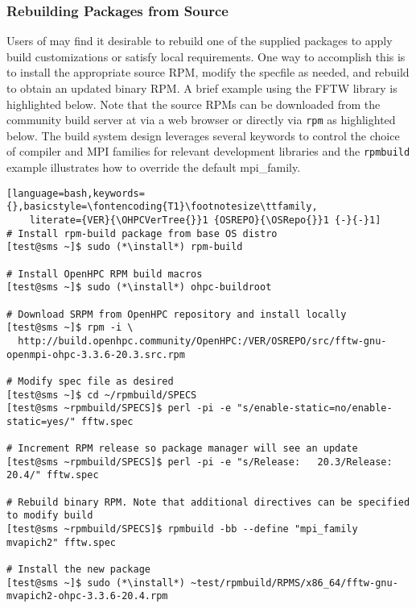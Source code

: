 \subsubsection{Rebuilding Packages from Source}  \label{appendix:rpmbuild}

Users of \OHPC{} may find it desirable to rebuild one of the supplied packages
to apply build customizations or satisfy local requirements. One way to
accomplish this is to install the appropriate source RPM, modify the specfile
as needed, and rebuild to obtain an updated binary RPM. A brief example using
the FFTW library is highlighted below.  Note that the source RPMs can be downloaded from the
community build server at \href{https://build.openhpc.community}
{\color{blue}{https://build.openhpc.community}} via a web browser or directly
via \texttt{rpm} as highlighted below. The \OHPC{} build system design
leverages several keywords to control the choice of compiler and MPI families
for relevant development libraries and the \texttt{rpmbuild} example
illustrates how to override the default mpi\_family.

\begin{lstlisting}[language=bash,keywords={},basicstyle=\fontencoding{T1}\footnotesize\ttfamily,
    literate={VER}{\OHPCVerTree{}}1 {OSREPO}{\OSRepo{}}1 {-}{-}1]
# Install rpm-build package from base OS distro
[test@sms ~]$ sudo (*\install*) rpm-build

# Install OpenHPC RPM build macros
[test@sms ~]$ sudo (*\install*) ohpc-buildroot

# Download SRPM from OpenHPC repository and install locally
[test@sms ~]$ rpm -i \
  http://build.openhpc.community/OpenHPC:/VER/OSREPO/src/fftw-gnu-openmpi-ohpc-3.3.6-20.3.src.rpm

# Modify spec file as desired
[test@sms ~]$ cd ~/rpmbuild/SPECS
[test@sms ~rpmbuild/SPECS]$ perl -pi -e "s/enable-static=no/enable-static=yes/" fftw.spec

# Increment RPM release so package manager will see an update
[test@sms ~rpmbuild/SPECS]$ perl -pi -e "s/Release:   20.3/Release:   20.4/" fftw.spec

# Rebuild binary RPM. Note that additional directives can be specified to modify build
[test@sms ~rpmbuild/SPECS]$ rpmbuild -bb --define "mpi_family mvapich2" fftw.spec

# Install the new package
[test@sms ~]$ sudo (*\install*) ~test/rpmbuild/RPMS/x86_64/fftw-gnu-mvapich2-ohpc-3.3.6-20.4.rpm
\end{lstlisting}
